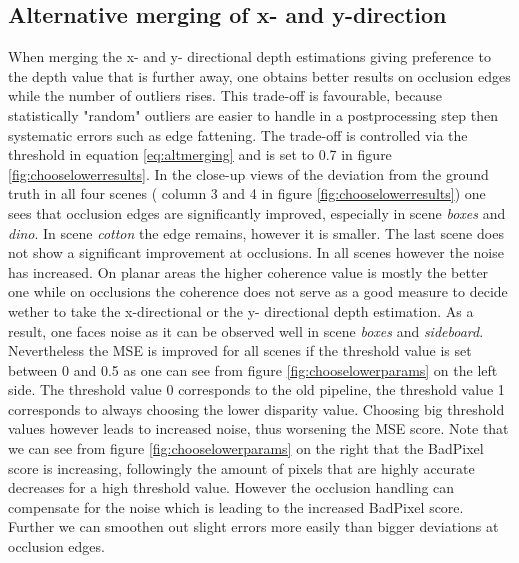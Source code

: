 \documentclass  [
  paper    = a4,
  BCOR     = 10mm,
  twoside,
  fontsize = 12pt,
  fleqn,
  toc      = bibnumbered,
  toc      = listofnumbered,
  numbers  = noendperiod,
  headings = normal,
  listof   = leveldown,
  version  = 3.03
]                                       {scrreprt}
\begin{document}
\subsection{Alternative merging of x- and y-direction}
\label{sec:ev_merging}
When merging the x- and y- directional depth estimations giving  preference to the depth value that is further away, one obtains better results on occlusion edges while the number of outliers rises. This trade-off is favourable, because statistically "random" outliers are easier to handle in a postprocessing step then systematic errors such as edge fattening. The trade-off is controlled via the threshold in equation \ref{eq:altmerging} and is set to 0.7 in figure \ref{fig:chooselowerresults}. In the close-up views of the deviation from the ground truth in all four scenes ( column 3 and 4 in figure \ref{fig:chooselowerresults}) one sees that occlusion edges are significantly improved, especially in scene \textit{boxes} and \textit{dino}. In scene \textit{cotton} the edge remains, however it is smaller. The last scene does not show a significant improvement at occlusions. In all scenes however the noise has increased. On planar areas the higher coherence value is mostly the better one while on occlusions the coherence does not serve as a good measure to decide wether to take the x-directional or the y- directional depth estimation. As a result, one faces noise as it can be observed well in scene \textit{boxes} and \textit{sideboard}. \\
Nevertheless the MSE is improved for all scenes if the threshold value is set between 0 and 0.5 as one can see from figure \ref{fig:chooselowerparams} on the left side. The threshold value 0 corresponds to the old pipeline, the threshold value 1 corresponds to always choosing the lower disparity value. Choosing big threshold values however leads to increased noise, thus worsening the MSE score. Note that we can see from figure \ref{fig:chooselowerparams} on the right that the BadPixel score is increasing, followingly the amount of pixels that are highly accurate decreases for a high threshold value. However the occlusion handling can compensate for the noise which is leading to the increased BadPixel score. Further we can smoothen out slight errors more easily than bigger deviations at occlusion edges.\\
\end{document}
